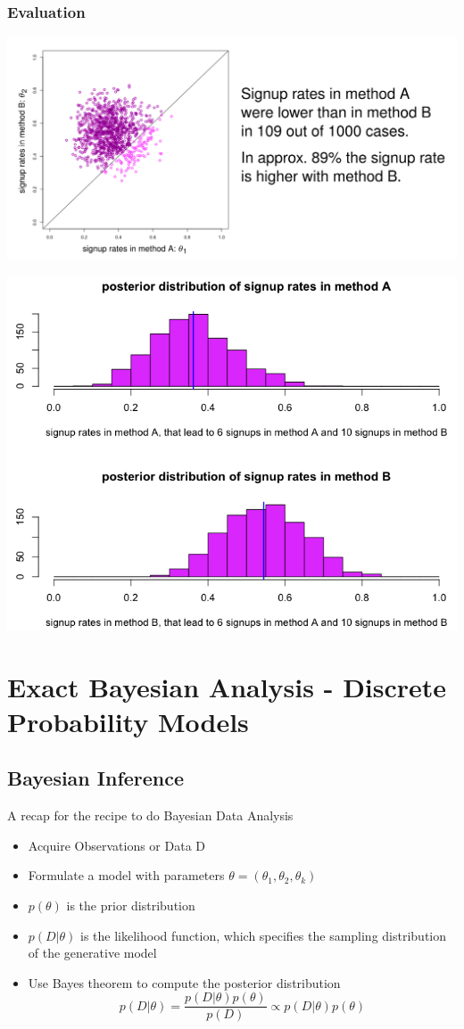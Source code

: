 \documentclass[11pt]{article}
\begin{document}
\subsubsection{Evaluation}

\begin{center}
	\includegraphics[width=0.6\linewidth]{img/ab_simulation_evaluation}
\end{center}
\begin{center}
	\includegraphics[width=0.6\linewidth]{img/ab_simulation_evaluation_signup}
\end{center}

\section{Exact Bayesian Analysis - Discrete Probability Models}

\subsection{Bayesian Inference}
A recap for the recipe to do Bayesian Data Analysis
\begin{itemize}
	\item Acquire Observations or Data D
	\item Formulate a model with parameters $\theta = (\theta_1, \theta_2, \theta_k)$
	\item $p(\theta)$ is the prior distribution
	\item $p(D|\theta)$ is the likelihood function, which specifies the sampling distribution of the generative model
	\item Use Bayes theorem to compute the posterior distribution
	\begin{equation*}
	p(D|\theta) = \frac{p(D|\theta)p(\theta)}{p(D)}\propto p(D|\theta)p(\theta)
	\end{equation*}
\end{itemize}
\end{document}
